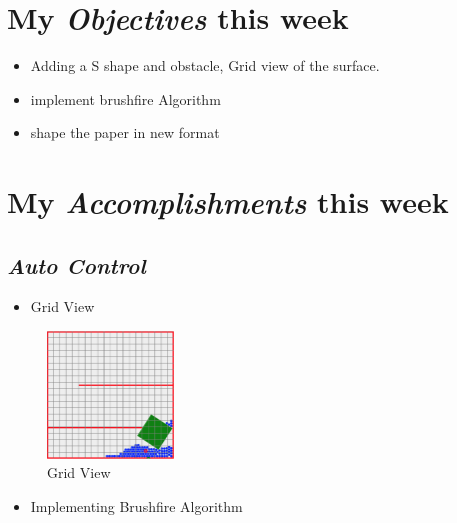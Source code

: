 \newcommand{\handoutName}{Weekly report}
\newcommand{\handoutdate}{Nov 25, 2014}
\newcommand{\duedate}{}


\section{My \emph{Objectives} this week}
\begin{itemize}
\item Adding a S shape and obstacle, Grid view of the surface.
\item implement brushfire Algorithm
\item shape the paper in new format
\end{itemize}


\section{My \emph{Accomplishments} this week}

\subsection{\emph{Auto Control}}

\begin{itemize}
\item Grid View
\end{itemize}




\begin{figure}
        \centering
         \includegraphics[width=0.3\textwidth]{fig/GridView.png}
                \caption{Grid View }
                \label{fig:gull}
        
\end{figure}


\begin{itemize}
\item Implementing Brushfire Algorithm
\end{itemize}

